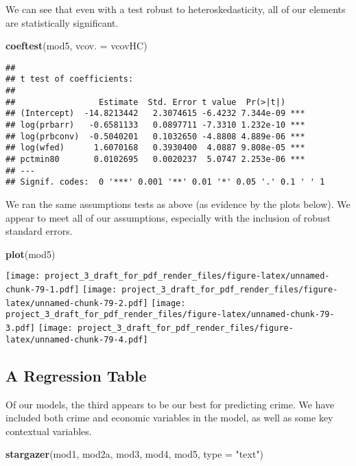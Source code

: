 \documentclass[]{article}
\newenvironment{Shaded}{\begin{snugshade}}{\end{snugshade}}
\newcommand{\DataTypeTok}[1]{\textcolor[rgb]{0.13,0.29,0.53}{#1}}
\newcommand{\KeywordTok}[1]{\textcolor[rgb]{0.13,0.29,0.53}{\textbf{#1}}}
\newcommand{\NormalTok}[1]{#1}
\newcommand{\StringTok}[1]{\textcolor[rgb]{0.31,0.60,0.02}{#1}}
\begin{document}
We can see that even with a test robust to heteroskedasticity, all of
our elements are statistically significant.

\begin{Shaded}
\begin{Highlighting}[]
\KeywordTok{coeftest}\NormalTok{(mod5, }\DataTypeTok{vcov. =}\NormalTok{ vcovHC)}
\end{Highlighting}
\end{Shaded}

\begin{verbatim}
## 
## t test of coefficients:
## 
##                 Estimate  Std. Error t value  Pr(>|t|)    
## (Intercept)  -14.8213442   2.3074615 -6.4232 7.344e-09 ***
## log(prbarr)   -0.6581133   0.0897711 -7.3310 1.232e-10 ***
## log(prbconv)  -0.5040201   0.1032650 -4.8808 4.889e-06 ***
## log(wfed)      1.6070168   0.3930400  4.0887 9.808e-05 ***
## pctmin80       0.0102695   0.0020237  5.0747 2.253e-06 ***
## ---
## Signif. codes:  0 '***' 0.001 '**' 0.01 '*' 0.05 '.' 0.1 ' ' 1
\end{verbatim}

We ran the same assumptions tests as above (as evidence by the plots
below). We appear to meet all of our assumptions, especially with the
inclusion of robust standard errors.

\begin{Shaded}
\begin{Highlighting}[]
\KeywordTok{plot}\NormalTok{(mod5)}
\end{Highlighting}
\end{Shaded}

\texttt{[image: project\_3\_draft\_for\_pdf\_render\_files/figure-latex/unnamed-chunk-79-1.pdf]}
\texttt{[image: project\_3\_draft\_for\_pdf\_render\_files/figure-latex/unnamed-chunk-79-2.pdf]}
\texttt{[image: project\_3\_draft\_for\_pdf\_render\_files/figure-latex/unnamed-chunk-79-3.pdf]}
\texttt{[image: project\_3\_draft\_for\_pdf\_render\_files/figure-latex/unnamed-chunk-79-4.pdf]}

\hypertarget{a-regression-table}{%
\subsection{A Regression Table}\label{a-regression-table}}

Of our models, the third appears to be our best for predicting crime. We
have included both crime and economic variables in the model, as well as
some key contextual variables.

\begin{Shaded}
\begin{Highlighting}[]
\KeywordTok{stargazer}\NormalTok{(mod1, mod2a, mod3, mod4, mod5, }\DataTypeTok{type =} \StringTok{"text"}\NormalTok{)}
\end{Highlighting}
\end{Shaded}
\end{document}
